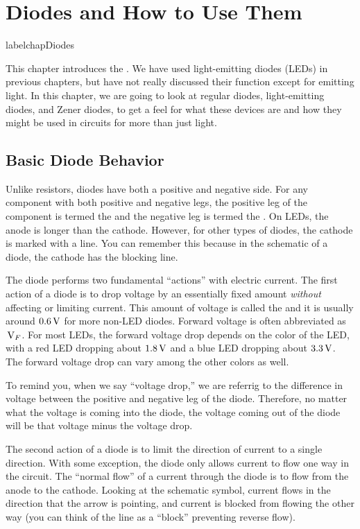 \chapter{Diodes and How to Use Them}
label{chapDiodes}

This chapter introduces the .  
We have used light-emitting diodes (LEDs) in previous chapters, but have not really discussed their function except for emitting light.
In this chapter, we are going to look at regular diodes, light-emitting diodes, and Zener diodes, to get a feel for what these devices are and how they might be used in circuits for more than just light.


\section{Basic Diode Behavior}

Unlike resistors, diodes have both a positive and negative side.
For any component with both positive and negative legs, the positive leg of the component is termed the  and the negative leg is termed the .
On LEDs, the anode is longer than the cathode.
However, for other types of diodes, the cathode is marked with a line.
You can remember this because in the schematic of a diode, the cathode has the blocking line.

The diode performs two fundamental ``actions'' with electric current.  
The first action of a diode is to drop voltage by an essentially fixed amount \emph{without} affecting or limiting current.
This amount of voltage is called the  and it is usually around $0.6\,\si{\volt}$ for more non-LED diodes. 
Forward voltage is often abbreviated as $\,\si{\volt}_F$.
For most LEDs, the forward voltage drop depends on the color of the LED, with a red LED dropping about $1.8\,\si{\volt}$ and a blue LED dropping about $3.3\,\si{\volt}$.
The forward voltage drop can vary among the other colors as well.

To remind you, when we say ``voltage drop,'' we are referrig to the difference in voltage between the positive and negative leg of the diode.
Therefore, no matter what the voltage is coming into the diode, the voltage coming out of the diode will be that voltage minus the voltage drop.

The second action of a diode is to limit the direction of current to a single direction.
With some exception, the diode only allows current to flow one way in the circuit.
The ``normal flow'' of a current through the diode is to flow from the anode to the cathode.
Looking at the schematic symbol, current flows in the direction that the arrow is pointing, and current is blocked from flowing the other way (you can think of the line as a ``block'' preventing reverse flow).


